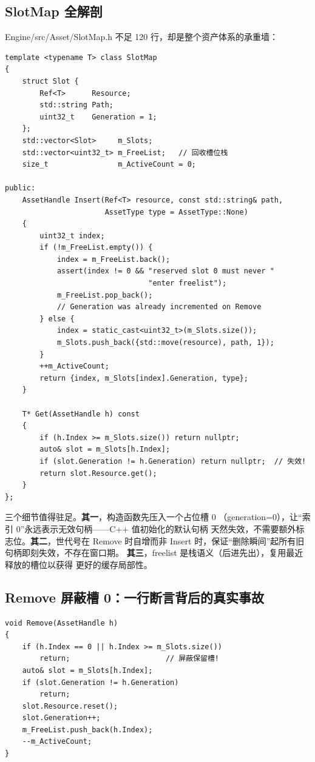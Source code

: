 \subsection{SlotMap 全解剖}

Engine/src/Asset/SlotMap.h 不足 120 行，却是整个资产体系的承重墙：

\begin{lstlisting}
template <typename T> class SlotMap
{
    struct Slot {
        Ref<T>      Resource;
        std::string Path;
        uint32_t    Generation = 1;
    };
    std::vector<Slot>     m_Slots;
    std::vector<uint32_t> m_FreeList;   // 回收槽位栈
    size_t                m_ActiveCount = 0;

public:
    AssetHandle Insert(Ref<T> resource, const std::string& path,
                       AssetType type = AssetType::None)
    {
        uint32_t index;
        if (!m_FreeList.empty()) {
            index = m_FreeList.back();
            assert(index != 0 && "reserved slot 0 must never "
                                 "enter freelist");
            m_FreeList.pop_back();
            // Generation was already incremented on Remove
        } else {
            index = static_cast<uint32_t>(m_Slots.size());
            m_Slots.push_back({std::move(resource), path, 1});
        }
        ++m_ActiveCount;
        return {index, m_Slots[index].Generation, type};
    }

    T* Get(AssetHandle h) const
    {
        if (h.Index >= m_Slots.size()) return nullptr;
        auto& slot = m_Slots[h.Index];
        if (slot.Generation != h.Generation) return nullptr;  // 失效!
        return slot.Resource.get();
    }
};
\end{lstlisting}

三个细节值得驻足。\textbf{其一}，构造函数先压入一个占位槽 0
（generation=0），让``索引 0''永远表示无效句柄——C++ 值初始化的默认句柄
天然失效，不需要额外标志位。\textbf{其二}，世代号在 Remove 时自增而非
Insert 时，保证``删除瞬间''起所有旧句柄即刻失效，不存在窗口期。
\textbf{其三}，freelist 是栈语义（后进先出），复用最近释放的槽位以获得
更好的缓存局部性。

\subsection{Remove 屏蔽槽 0：一行断言背后的真实事故}

\begin{lstlisting}
void Remove(AssetHandle h)
{
    if (h.Index == 0 || h.Index >= m_Slots.size())
        return;                      // 屏蔽保留槽!
    auto& slot = m_Slots[h.Index];
    if (slot.Generation != h.Generation)
        return;
    slot.Resource.reset();
    slot.Generation++;
    m_FreeList.push_back(h.Index);
    --m_ActiveCount;
}
\end{lstlisting}

